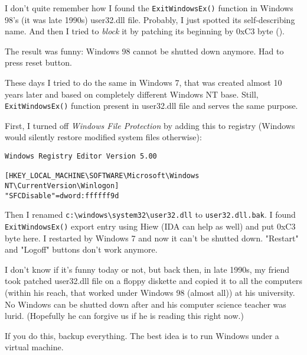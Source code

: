 
I don't quite remember how I found the \verb|ExitWindowsEx()| function in Windows 98's (it was late 1990s) user32.dll file.
Probably, I just spotted its self-describing name.
And then I tried to \emph{block} it by patching its beginning by 0xC3 byte ().

The result was funny: Windows 98 cannot be shutted down anymore.
Had to press reset button.

These days I tried to do the same in Windows 7, that was created almost 10 years later and based on completely different Windows NT
base.
Still, \verb|ExitWindowsEx()| function present in user32.dll file and serves the same purpose.

First, I turned off \emph{Windows File Protection} by adding this to registry
(Windows would silently restore modified system files otherwise):

\begin{lstlisting}
Windows Registry Editor Version 5.00

[HKEY_LOCAL_MACHINE\SOFTWARE\Microsoft\Windows NT\CurrentVersion\Winlogon]
"SFCDisable"=dword:ffffff9d
\end{lstlisting}

Then I renamed \verb|c:\windows\system32\user32.dll| to \verb|user32.dll.bak|.
I found \verb|ExitWindowsEx()| export entry using Hiew (IDA can help as well) and put 0xC3 byte here.
I restarted by Windows 7 and now it can't be shutted down.
"Restart" and "Logoff" buttons don't work anymore.

I don't know if it's funny today or not, but back then, in late 1990s, my friend took patched user32.dll file
on a floppy diskette and copied it to all the computers
(within his reach, that worked under Windows 98 (almost all))
at his university.
No Windows can be shutted down after and his computer science teacher was lurid.
(Hopefully he can forgive us if he is reading this right now.)


If you do this, backup everything.
The best idea is to run Windows under a virtual machine.

